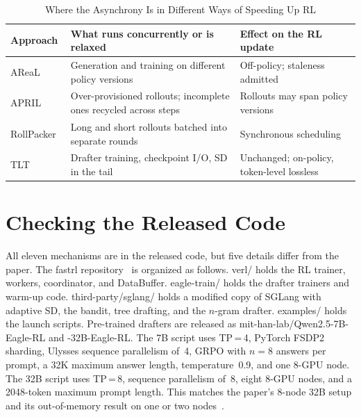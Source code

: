 \documentclass[conference]{IEEEtran}
\newcommand{\brkus}{\textunderscore\allowbreak}
\newcommand{\code}[1]{{\small\ttfamily\let\_\brkus\hyphenchar\font=-1 #1}}
\newcommand{\tablestyle}{\footnotesize\renewcommand{\arraystretch}{1.3}\rowcolors{2}{stripe}{white}}
\begin{document}
\begin{table}[t]
\centering
\caption{Where the Asynchrony Is in Different Ways of Speeding Up RL}
\label{tab:async}
\tablestyle
\begin{tabular}{@{}L{1.85cm}L{3.0cm}L{2.65cm}@{}}
\toprule
{}\textbf{Approach} & \textbf{What runs concurrently or is relaxed} & \textbf{Effect on the RL update} \\
\midrule
AReaL~\cite{fu2025areal} & Generation and training on different policy versions & Off-policy; staleness admitted \\
APRIL~\cite{zhou2025april} & Over-provisioned rollouts; incomplete ones recycled across steps & Rollouts may span policy versions \\
RollPacker~\cite{gao2025rollpacker} & Long and short rollouts batched into separate rounds & Synchronous scheduling \\
TLT~\cite{hu2026tlt} & Drafter training, checkpoint I/O, SD in the tail & Unchanged; on-policy, token-level lossless \\
\bottomrule
\end{tabular}
\end{table}

\section{Checking the Released Code}
\label{sec:audit}

All eleven mechanisms are in the released code, but five details differ from the paper. The \code{fastrl} repository~\cite{fastrl} is organized as follows. \code{verl/} holds the RL trainer, workers, coordinator, and DataBuffer. \code{eagle-train/} holds the drafter trainers and warm-up code. \code{third-party/sglang/} holds a modified copy of SGLang with adaptive SD, the bandit, tree drafting, and the $n$-gram drafter. \code{examples/} holds the launch scripts. Pre-trained drafters are released as \code{mit-han-lab/Qwen2.5-7B-Eagle-RL} and \code{-32B-Eagle-RL}. The 7B script uses TP\,=\,4, PyTorch FSDP2 sharding, Ulysses sequence parallelism of~4, GRPO with $n=8$ answers per prompt, a 32K maximum answer length, temperature~0.9, and one 8-GPU node. The 32B script uses TP\,=\,8, sequence parallelism of~8, eight 8-GPU nodes, and a 2048-token maximum prompt length. This matches the paper's 8-node 32B setup and its out-of-memory result on one or two nodes~\cite[Table~3]{hu2026tlt}.
\end{document}

